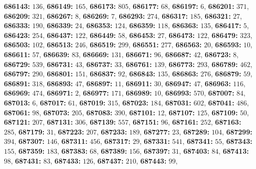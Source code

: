 \textsf{\bfseries 686143:} $136$, \textsf{\bfseries 686149:} $165$, \textsf{\bfseries 686173:} $805$, \textsf{\bfseries 686177:} $68$, \textsf{\bfseries 686197:} $6$, \textsf{\bfseries 686201:} $371$, \textsf{\bfseries 686209:} $321$, \textsf{\bfseries 686267:} $8$, \textsf{\bfseries 686269:} $7$, \textsf{\bfseries 686293:} $274$, \textsf{\bfseries 686317:} $185$, \textsf{\bfseries 686321:} $27$, \textsf{\bfseries 686333:} $190$, \textsf{\bfseries 686339:} $24$, \textsf{\bfseries 686353:} $124$, \textsf{\bfseries 686359:} $118$, \textsf{\bfseries 686363:} $135$, \textsf{\bfseries 686417:} $5$, \textsf{\bfseries 686423:} $254$, \textsf{\bfseries 686437:} $122$, \textsf{\bfseries 686449:} $58$, \textsf{\bfseries 686453:} $27$, \textsf{\bfseries 686473:} $122$, \textsf{\bfseries 686479:} $323$, \textsf{\bfseries 686503:} $102$, \textsf{\bfseries 686513:} $246$, \textsf{\bfseries 686519:} $299$, \textsf{\bfseries 686551:} $277$, \textsf{\bfseries 686563:} $20$, \textsf{\bfseries 686593:} $10$, \textsf{\bfseries 686611:} $57$, \textsf{\bfseries 686639:} $83$, \textsf{\bfseries 686669:} $131$, \textsf{\bfseries 686671:} $96$, \textsf{\bfseries 686687:} $42$, \textsf{\bfseries 686723:} $8$, \textsf{\bfseries 686729:} $539$, \textsf{\bfseries 686731:} $43$, \textsf{\bfseries 686737:} $33$, \textsf{\bfseries 686761:} $139$, \textsf{\bfseries 686773:} $293$, \textsf{\bfseries 686789:} $462$, \textsf{\bfseries 686797:} $290$, \textsf{\bfseries 686801:} $151$, \textsf{\bfseries 686837:} $92$, \textsf{\bfseries 686843:} $135$, \textsf{\bfseries 686863:} $276$, \textsf{\bfseries 686879:} $59$, \textsf{\bfseries 686891:} $318$, \textsf{\bfseries 686893:} $47$, \textsf{\bfseries 686897:} $11$, \textsf{\bfseries 686911:} $30$, \textsf{\bfseries 686947:} $47$, \textsf{\bfseries 686963:} $116$, \textsf{\bfseries 686969:} $474$, \textsf{\bfseries 686971:} $2$, \textsf{\bfseries 686977:} $171$, \textsf{\bfseries 686989:} $10$, \textsf{\bfseries 686993:} $570$, \textsf{\bfseries 687007:} $84$, \textsf{\bfseries 687013:} $6$, \textsf{\bfseries 687017:} $61$, \textsf{\bfseries 687019:} $315$, \textsf{\bfseries 687023:} $184$, \textsf{\bfseries 687031:} $602$, \textsf{\bfseries 687041:} $486$, \textsf{\bfseries 687061:} $98$, \textsf{\bfseries 687073:} $205$, \textsf{\bfseries 687083:} $390$, \textsf{\bfseries 687101:} $12$, \textsf{\bfseries 687107:} $125$, \textsf{\bfseries 687109:} $50$, \textsf{\bfseries 687121:} $207$, \textsf{\bfseries 687131:} $306$, \textsf{\bfseries 687139:} $557$, \textsf{\bfseries 687151:} $96$, \textsf{\bfseries 687161:} $252$, \textsf{\bfseries 687163:} $285$, \textsf{\bfseries 687179:} $31$, \textsf{\bfseries 687223:} $207$, \textsf{\bfseries 687233:} $189$, \textsf{\bfseries 687277:} $23$, \textsf{\bfseries 687289:} $104$, \textsf{\bfseries 687299:} $394$, \textsf{\bfseries 687307:} $146$, \textsf{\bfseries 687311:} $456$, \textsf{\bfseries 687317:} $29$, \textsf{\bfseries 687331:} $541$, \textsf{\bfseries 687341:} $55$, \textsf{\bfseries 687343:} $155$, \textsf{\bfseries 687359:} $183$, \textsf{\bfseries 687383:} $68$, \textsf{\bfseries 687389:} $156$, \textsf{\bfseries 687397:} $31$, \textsf{\bfseries 687403:} $84$, \textsf{\bfseries 687413:} $98$, \textsf{\bfseries 687431:} $83$, \textsf{\bfseries 687433:} $126$, \textsf{\bfseries 687437:} $210$, \textsf{\bfseries 687443:} $99$, 
